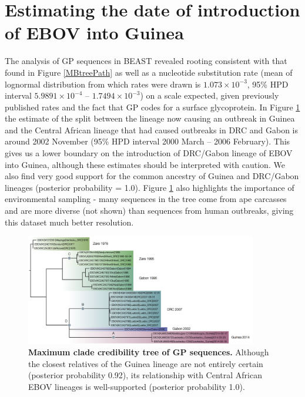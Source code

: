 \documentclass[11pt,oneside,letterpaper]{article}
\begin{document}
\section*{Estimating the date of introduction of EBOV into Guinea}
The analysis of GP sequences in BEAST revealed rooting consistent with that found in Figure \ref{MBtreePath} as well as a nucleotide substitution rate (mean of lognormal distribution from which rates were drawn is $1.073\times10^{-3}$, 95\% HPD interval $5.9891\times10^{-4}$ -- $1.7494\times10^{-3}$) on a scale expected, given previously published rates \cite{carroll2013} and the fact that GP codes for a surface glycoprotein.
In Figure \ref{beastTree} the estimate of the split between the lineage now causing an outbreak in Guinea and the Central African lineage that had caused outbreaks in DRC and Gabon is around 2002 November (95\% HPD interval 2000 March -- 2006 February).
This gives us a lower boundary on the introduction of DRC/Gabon lineage of EBOV into Guinea, although these estimates should be interpreted with caution.
We also find very good support for the common ancestry of Guinea and DRC/Gabon lineages (posterior probability = 1.0).
Figure \ref{beastTree} also highlights the importance of environmental sampling - many sequences in the tree come from ape carcasses and are more diverse (not shown) than sequences from human outbreaks, giving this dataset much better resolution.

\begin{figure}[h!]
\centering  
\includegraphics[width=0.9\textwidth]  {figures/EBOV_cds_mb_rootedTree.png}
\caption{\textbf{Maximum clade credibility tree of GP sequences.}
Although the closest relatives of the Guinea lineage are not entirely certain (posterior probability 0.92), its relationship with Central African EBOV lineages is well-supported (posterior probability 1.0).}
\label{beastTree}
\end{figure}
\end{document}

